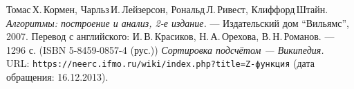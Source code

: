 \begin{thebibliography}{99}
Томас\,Х.\,Кормен, Чарльз\,И.\,Лейзерсон, Рональд\,Л.\,Ривест, Клиффорд\,Штайн.
{\itshape Алгоритмы: построение и анализ, 2-е издание.} --- Издательский дом \enquote{Вильямс}, 2007. Перевод с английского: И.\,В.\,Красиков, Н.\,А.\,Орехова, В.\,Н.\,Романов. --- 1296 с. (ISBN 5-8459-0857-4 (рус.))
{\itshape Сортировка подсчётом — Википедия.} \\URL: \texttt{https://neerc.ifmo.ru/wiki/index.php?title=Z-функция} (дата обращения: 16.12.2013).
\end{thebibliography}
\pagebreak